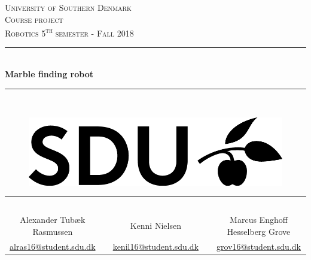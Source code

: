 \documentclass[../Head/Main.tex]{subfiles}
\begin{document}
\begin{titlepage}
\begin{center}
\textsc{\LARGE University of Southern Denmark}\\[1.25cm]

\textsc{Course project}\\[0.35cm]

\textsc{\large Robotics 5\textsuperscript{th} semester - Fall 2018}\\[0.35cm]
\rule{\linewidth}{0.5mm}\\[0.35cm]
{ \LARGE \bfseries Marble finding robot\\[0.35cm]}
\rule{\linewidth}{0.5mm}\\[1cm]

\vspace{3cm}

    \begin{figure}[h!]
    \centering
    \includegraphics[scale=1]{../Figures/SDUlogo}
    \label{fig:SDUlogo}\\
    [2.5cm]
    \end{figure}

\begin{tabular}{c c c c c}
    \\
    \\
    \\
    \\
    \\
    \\
    \cline{1-1}\cline{3-3}\cline{5-5}
    Alexander Tubæk Rasmussen & & Kenni Nielsen & & Marcus Enghoff Hesselberg Grove \\
    \href{mailto:alras16@student.sdu.dk}{alras16@student.sdu.dk} & & \href{mailto:kenil16@student.sdu.dk}{kenil16@student.sdu.dk} & &
    \href{mailto:mgrov16@student.sdu.dk}{grov16@student.sdu.dk}
    \\
\end{tabular}	

\vfill


\end{center}
\end{titlepage}
\end{document}
